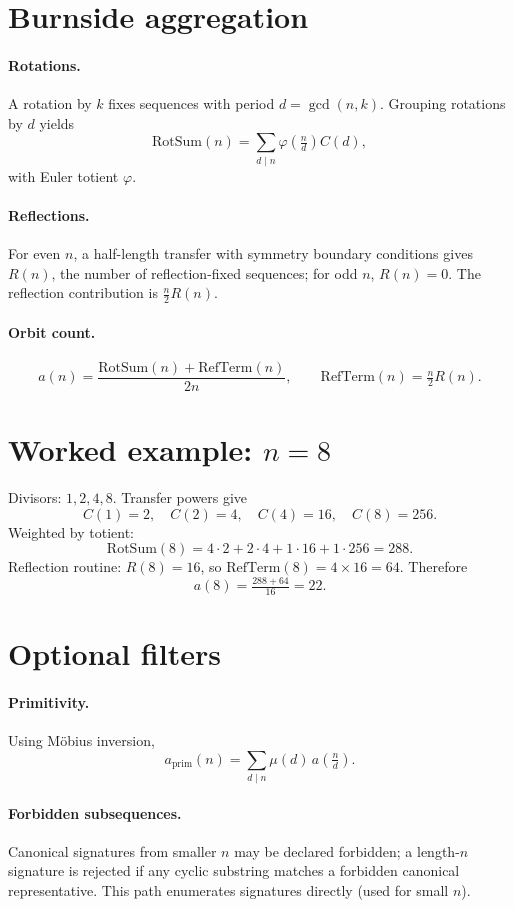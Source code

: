 \documentclass[12pt]{article}
\theoremstyle{definition}
\begin{document}
\section{Burnside aggregation}
\paragraph{Rotations.} A rotation by \(k\) fixes sequences with period \(d=\gcd(n,k)\). Grouping rotations by \(d\) yields
\[
\text{RotSum}(n)=\sum_{d\mid n}\varphi\!\left(\tfrac{n}{d}\right) C(d),
\]
with Euler totient \(\varphi\).
\paragraph{Reflections.} For even \(n\), a half-length transfer with symmetry boundary conditions gives \(R(n)\), the number of reflection-fixed sequences; for odd \(n\), \(R(n)=0\). The reflection contribution is \(\tfrac{n}{2}R(n)\).
\paragraph{Orbit count.}
\[
 a(n)=\frac{\text{RotSum}(n)+\text{RefTerm}(n)}{2n},\qquad \text{RefTerm}(n)=\tfrac{n}{2}R(n).
\]

\section{Worked example: \(n=8\)}
Divisors: \(1,2,4,8\). Transfer powers give
\[
C(1)=2,\quad C(2)=4,\quad C(4)=16,\quad C(8)=256.
\]
Weighted by totient:
\[
\text{RotSum}(8)=4\cdot2+2\cdot4+1\cdot16+1\cdot256=288.
\]
Reflection routine: \(R(8)=16\), so \(\text{RefTerm}(8)=4\times16=64\). Therefore
\[
 a(8)=\tfrac{288+64}{16}=22.
\]

\section{Optional filters}
\paragraph{Primitivity.} Using Möbius inversion,
\[
 a_{\mathrm{prim}}(n)=\sum_{d\mid n}\mu(d)\, a\!\left(\tfrac{n}{d}\right).
\]
\paragraph{Forbidden subsequences.} Canonical signatures from smaller \(n\) may be declared forbidden; a length-\(n\) signature is rejected if any cyclic substring matches a forbidden canonical representative. This path enumerates signatures directly (used for small \(n\)).
\end{document}
